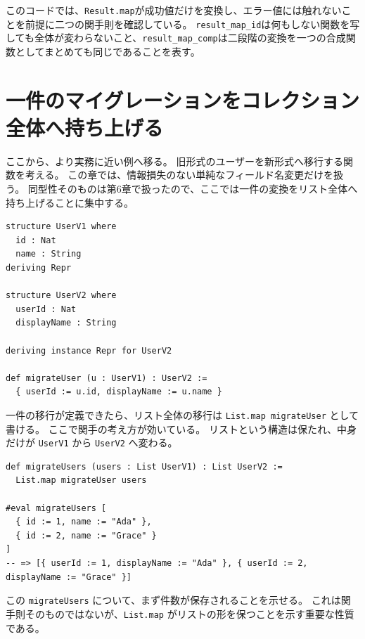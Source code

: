 このコードでは、\texttt{Result.map}が成功値だけを変換し、エラー値には触れないことを前提に二つの関手則を確認している。
\texttt{result\_map\_id}は何もしない関数を写しても全体が変わらないこと、\texttt{result\_map\_comp}は二段階の変換を一つの合成関数としてまとめても同じであることを表す。

\section{一件のマイグレーションをコレクション全体へ持ち上げる}

ここから、より実務に近い例へ移る。
旧形式のユーザーを新形式へ移行する関数を考える。
この章では、情報損失のない単純なフィールド名変更だけを扱う。
同型性そのものは第6章で扱ったので、ここでは一件の変換をリスト全体へ持ち上げることに集中する。

\begin{listing}[htbp]
\begin{verbatim}
structure UserV1 where
  id : Nat
  name : String
deriving Repr

structure UserV2 where
  userId : Nat
  displayName : String

deriving instance Repr for UserV2

def migrateUser (u : UserV1) : UserV2 :=
  { userId := u.id, displayName := u.name }
\end{verbatim}
\caption{一件のユーザー移行を定義する}
\label{lst:ch08_user_migration_one}
\end{listing}

一件の移行が定義できたら、リスト全体の移行は \texttt{List.map migrateUser} として書ける。
ここで関手の考え方が効いている。
リストという構造は保たれ、中身だけが \texttt{UserV1} から \texttt{UserV2} へ変わる。

\begin{listing}[htbp]
\begin{verbatim}
def migrateUsers (users : List UserV1) : List UserV2 :=
  List.map migrateUser users

#eval migrateUsers [
  { id := 1, name := "Ada" },
  { id := 2, name := "Grace" }
]
-- => [{ userId := 1, displayName := "Ada" }, { userId := 2, displayName := "Grace" }]
\end{verbatim}
\caption{一件の移行をリスト全体へ持ち上げる}
\label{lst:ch08_user_migration_list}
\end{listing}

この \texttt{migrateUsers} について、まず件数が保存されることを示せる。
これは関手則そのものではないが、\texttt{List.map} がリストの形を保つことを示す重要な性質である。

